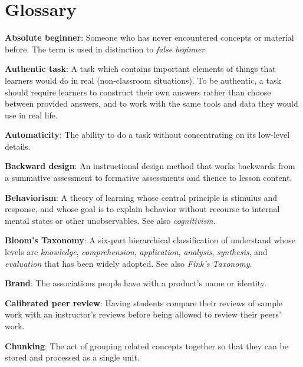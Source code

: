 \chapter{Glossary}\label{s:gloss}

\textbf{\hypertarget{g:absolute-beginner}{Absolute beginner}\label{g:absolute-beginner}}: Someone who has
never encountered concepts or material before. The term is used in
distinction to \emph{false beginner}.

\textbf{\hypertarget{g:authentic-task}{Authentic task}\label{g:authentic-task}}: A task which contains
important elements of things that learners would do in real
(non-classroom situations). To be authentic, a task should require
learners to construct their own answers rather than choose between
provided answers, and to work with the same tools and data they would
use in real life.

\textbf{\hypertarget{g:automaticity}{Automaticity}\label{g:automaticity}}: The ability to do a task
without concentrating on its low-level details.

\textbf{\hypertarget{g:backward-design}{Backward design}\label{g:backward-design}}: An instructional design
method that works backwards from a summative assessment to formative
assessments and thence to lesson content.

\textbf{\hypertarget{g:behaviorism}{Behaviorism}\label{g:behaviorism}}: A theory of learning whose
central principle is stimulus and response, and whose goal is to explain
behavior without recourse to internal mental states or other
unobservables. See also \emph{cognitivism}.

\textbf{\hypertarget{g:blooms-taxonomy}{Bloom's Taxonomy}\label{g:blooms-taxonomy}}: A six-part
hierarchical classification of understand whose levels are \emph{knowledge},
\emph{comprehension}, \emph{application}, \emph{analysis}, \emph{synthesis}, and
\emph{evaluation} that has been widely adopted. See also \emph{Fink's Taxonomy}.

\textbf{\hypertarget{g:brand}{Brand}\label{g:brand}}: The associations people have with a
product's name or identity.

\textbf{\hypertarget{g:calibrated-peer-review}{Calibrated peer review}\label{g:calibrated-peer-review}}: Having
students compare their reviews of sample work with an instructor's
reviews before being allowed to review their peers' work.

\textbf{\hypertarget{g:chunking}{Chunking}\label{g:chunking}}: The act of grouping related concepts
together so that they can be stored and processed as a single unit.

